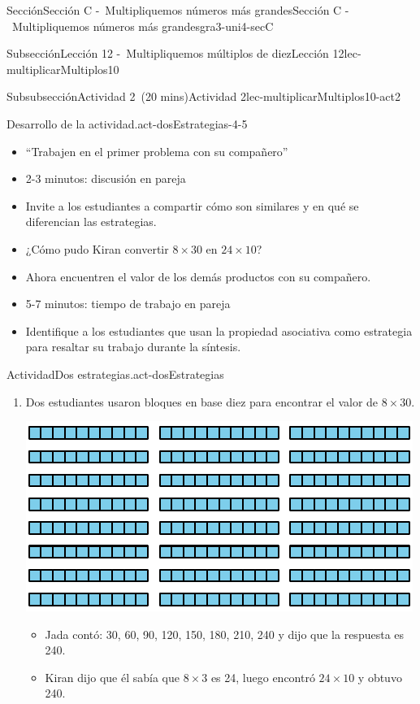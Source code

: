 \documentclass[oneside,10pt,]{article}
\begin{document}
\begin{sectionptx}{Sección}{Sección C -~Multipliquemos números más grandes}{}{Sección C -~Multipliquemos números más grandes}{}{}{gra3-uni4-secC}
\begin{subsectionptx}{Subsección}{Lección 12 -~Multipliquemos múltiplos de diez}{}{Lección 12}{}{}{lec-multiplicarMultiplos10}
\begin{subsubsectionptx}{Subsubsección}{Actividad 2~(20 mins)}{}{Actividad 2}{}{}{lec-multiplicarMultiplos10-act2}
\begin{paragraphs}{Desarrollo de la actividad.}{act-dosEstrategias-4-5}%
%
\begin{itemize}[label=\textbullet]
\item{}``Trabajen en el primer problema con su compañero''%
\item{}2-3 minutos: discusión en pareja%
\item{}Invite a los estudiantes a compartir cómo son similares y en qué se diferencian las estrategias.%
\item{}¿Cómo pudo Kiran convertir \(8 \times 30\) en \(24 \times 10\)?%
\item{}Ahora encuentren el valor de los demás productos con su compañero.%
\item{}5-7 minutos: tiempo de trabajo en pareja%
\item{}Identifique a los estudiantes que usan la propiedad asociativa como estrategia para resaltar su trabajo durante la síntesis.%
\end{itemize}
\end{paragraphs}%
\begin{activity}{Actividad}{Dos estrategias.}{act-dosEstrategias}%
%
\begin{enumerate}
\item{}Dos estudiantes usaron bloques en base diez para encontrar el valor de \(8\times 30\).%
\begin{image}{0}{1}{0}{}%
\includegraphics[width=\linewidth]{external/svg-source/tikz-file-149356-scale13.pdf}
\end{image}%
%
\begin{itemize}[label=\textbullet]
\item{}Jada contó: 30, 60, 90, 120, 150, 180, 210, 240 y dijo que la respuesta es 240.%
\item{}Kiran dijo que él sabía que \(8\times 3\) es 24, luego encontró \(24\times 10\) y obtuvo 240.%

\end{itemize}
\end{enumerate}
\end{activity}
\end{subsubsectionptx}
\end{subsectionptx}
\end{sectionptx}
\end{document}
